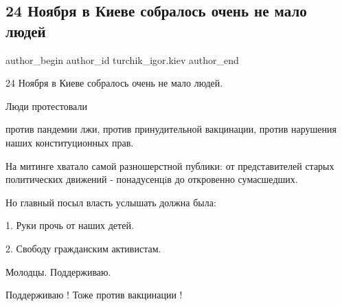  
 
 
 
 
 
\subsection{24 Ноября в Киеве собралось очень не мало людей}
\label{sec:25_11_2021.fb.turchik_igor.kiev.1.kiev_protest}
 
\ifcmt
 author_begin
   author_id turchik_igor.kiev
 author_end
\fi

24 Ноября в Киеве собралось очень не мало людей. 

Люди протестовали 

против пандемии лжи, против принудительной вакцинации, против нарушения наших
конституционных прав.

На митинге  хватало самой разношерстной публики: от представителей старых
политических движений -  понадусенцiв до откровенно сумасшедших.


Но главный посыл власть услышать должна была:

1. Руки прочь от наших детей.

2. Свободу гражданским активистам.

\begin{itemize} %
Молодцы. Поддерживаю.

Поддерживаю !
Тоже против вакцинации !
\end{itemize} %
